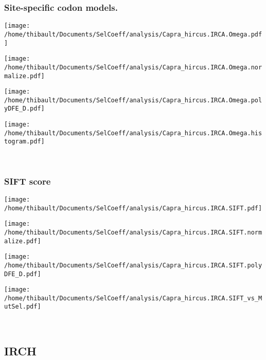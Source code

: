\subsubsection*{Site-specific codon models.} 
\begin{minipage}{0.49\linewidth} 
\texttt{[image: /home/thibault/Documents/SelCoeff/analysis/Capra\_hircus.IRCA.Omega.pdf]} 
\end{minipage}
\begin{minipage}{0.49\linewidth} 
\texttt{[image: /home/thibault/Documents/SelCoeff/analysis/Capra\_hircus.IRCA.Omega.normalize.pdf]} 
\end{minipage}
\begin{minipage}{0.49\linewidth} 
\texttt{[image: /home/thibault/Documents/SelCoeff/analysis/Capra\_hircus.IRCA.Omega.polyDFE\_D.pdf]} 
\end{minipage}
\begin{minipage}{0.49\linewidth} 
\texttt{[image: /home/thibault/Documents/SelCoeff/analysis/Capra\_hircus.IRCA.Omega.histogram.pdf]} 
\end{minipage}
\\ 
\subsubsection*{SIFT score} 
\begin{minipage}{0.49\linewidth} 
\texttt{[image: /home/thibault/Documents/SelCoeff/analysis/Capra\_hircus.IRCA.SIFT.pdf]} 
\end{minipage}
\begin{minipage}{0.49\linewidth} 
\texttt{[image: /home/thibault/Documents/SelCoeff/analysis/Capra\_hircus.IRCA.SIFT.normalize.pdf]} 
\end{minipage}
\begin{minipage}{0.49\linewidth} 
\texttt{[image: /home/thibault/Documents/SelCoeff/analysis/Capra\_hircus.IRCA.SIFT.polyDFE\_D.pdf]} 
\end{minipage}
\begin{minipage}{0.49\linewidth} 
\texttt{[image: /home/thibault/Documents/SelCoeff/analysis/Capra\_hircus.IRCA.SIFT\_vs\_MutSel.pdf]} 
\end{minipage}
\\ 
\subsection{IRCH} 
 
